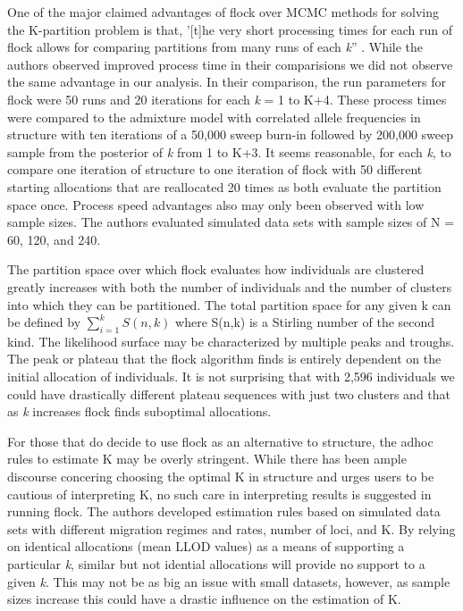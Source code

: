 One of the major claimed advantages of {\sc flock} over MCMC methods for solving the 
K-partition problem is that, '[t]he very short processing times for each run of {\sc flock} allows for
 comparing partitions from many runs of each \textit{k}'' \citep[][p.~735]{Duc&Tur2012}.
While the authors observed improved process time in their 
comparisions we did not observe the same advantage in our analysis. In their comparison, the 
run parameters for {\sc flock} were 50 runs and 20 iterations for each \textit{k} = 1 to K+4. 
These process times were compared to the admixture model with correlated allele 
frequencies in {\sc structure} with ten iterations of a 50,000 sweep burn-in followed 
by 200,000 sweep sample from the posterior of \textit{k} from 1 to K+3. 
It seems reasonable, for each \textit{k}, to compare one iteration of {\sc structure} 
to one iteration of {\sc flock} with 50 different starting allocations that are reallocated 20 times 
as both evaluate the partition space once. Process speed advantages also may only been observed 
with low sample sizes. The authors evaluated simulated data sets with sample sizes of N = 60, 120, 
and 240. 

The partition space over which {\sc flock} evaluates how individuals are clustered 
greatly increases with both the number of individuals and the number of clusters into 
which they can be partitioned. The total partition space for any given k can be 
defined by $\sum\limits_{i=1}^k S(n,k)$ where S(n,k) is a Stirling number of the 
second kind. The likelihood surface may be characterized by multiple peaks and troughs.
The peak or plateau that the  {\sc flock} algorithm finds is entirely dependent on the initial allocation of 
individuals. It is not surprising that with 2,596 individuals we could have 
drastically different plateau sequences with just two clusters and that as \textit{k} increases
{\sc flock} finds suboptimal allocations. 

For those that do decide to use {\sc flock} as an alternative to {\sc structure}, the adhoc rules 
to estimate K may be overly stringent. While there has been ample 
discourse concering choosing the optimal K in  {\sc structure} \citep{Evannoetal2005, 
Pritchardetal2000, Wap&Gag2006} and \citet{Pritchardetal2000} urges users 
to be cautious of interpreting K, no such care in interpreting results 
is suggested in running {\sc flock}. The authors developed estimation rules based on simulated data 
sets with different migration regimes and rates, number of loci, and K. 
By relying on identical allocations (mean LLOD values) as a means of supporting 
a particular \textit{k},  similar but not idential 
allocations will provide no support to a given \textit{k}. This may not be as big an issue with small datasets,
however, as sample sizes increase this could have a drastic influence on the estimation of 
K. 



 
